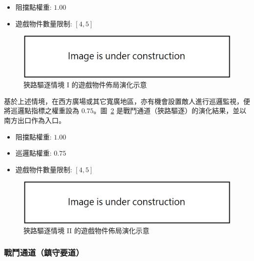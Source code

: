 \begin{itemize}
  \setlength\itemsep{-0.5em}
  \item 阻擋點權重: $1.00$
  \item 遊戲物件數量限制: $[4, 5]$
\end{itemize}

\begin{figure}[H]
  \begin{center}
    \includegraphics[width=1.0\textwidth]{figures/under_construction.png}
    \caption{狹路驅逐情境 I 的遊戲物件佈局演化示意} 
    \label{fig:applied-ga-on-volume-battlepath-narrow-i}
  \end{center}
\end{figure}

基於上述情境，在西方廣場或其它寬廣地區，亦有機會設置敵人進行巡邏監視，便將巡邏點指標之權重設為 $0.75$。圖~\ref{fig:applied-ga-on-volume-battlepath-narrow-ii} 是戰鬥通道（狹路驅逐）的演化結果，並以南方出口作為入口。

\begin{itemize}
  \setlength\itemsep{-0.5em}
  \item 阻擋點權重: $1.00$
  \item 巡邏點權重: $0.75$
  \item 遊戲物件數量限制: $[4, 5]$
\end{itemize}

\begin{figure}[H]
  \begin{center}
    \includegraphics[width=1.0\textwidth]{figures/under_construction.png}
    \caption{狹路驅逐情境 II 的遊戲物件佈局演化示意} 
    \label{fig:applied-ga-on-volume-battlepath-narrow-ii}
  \end{center}
\end{figure}

\subsubsection{戰鬥通道（鎮守要道）}
\label{sssec:method-segments-appliedonvolumes-battlepath-trunk}

